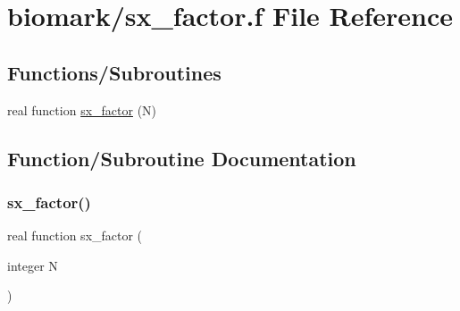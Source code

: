 \hypertarget{sx__factor_8f}{}\section{biomark/sx\+\_\+factor.f File Reference}
\label{sx__factor_8f}
\subsection*{Functions/\+Subroutines}
\begin{DoxyCompactItemize}
\item 
real function \hyperlink{sx__factor_8f_a393a4a3a070499b3eb905266ad44033b}{sx\+\_\+factor} (N)
\end{DoxyCompactItemize}


\subsection{Function/\+Subroutine Documentation}
\mbox{\label{sx__factor_8f_a393a4a3a070499b3eb905266ad44033b}} 
\subsubsection{\texorpdfstring{sx\+\_\+factor()}{sx\_factor()}}
{\footnotesize\ttfamily real function sx\+\_\+factor (\begin{DoxyParamCaption}\item[{integer}]{N }\end{DoxyParamCaption})}

